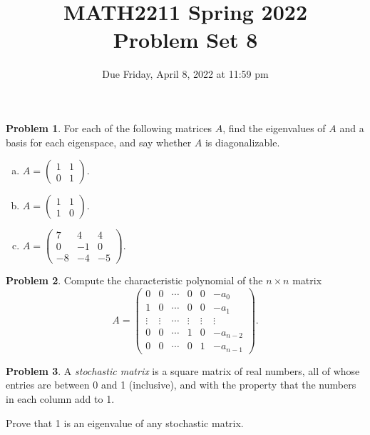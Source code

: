 \documentclass[11pt,oneside]{amsart}
\title{MATH2211 Spring 2022\\
Problem Set 8}
\author{Due Friday, April 8, 2022 at 11:59 pm}
\theoremstyle{definition}
\newtheorem{problem}{Problem}
\begin{document}
    \maketitle
    
    \begin{problem}
        For each of the following matrices $A$, find the eigenvalues of $A$ and a basis for each eigenspace, and say whether $A$ is diagonalizable.
        \begin{enumerate}[(a)]
            \item $A=\begin{pmatrix}
                1&1\\0&1
            \end{pmatrix}$.
            \item $A=\begin{pmatrix}
                1&1\\1&0
            \end{pmatrix}$.
            \item $A=\begin{pmatrix}
                7&4&4\\0&-1&0\\-8&-4&-5
            \end{pmatrix}$.
        \end{enumerate}
    \end{problem}

    \begin{problem}
        Compute the characteristic polynomial of the $n\times n$ matrix
        \[A=\begin{pmatrix}
            0&0&\cdots&0&0&-a_0\\
            1&0&\cdots&0&0&-a_1\\
            \vdots&\vdots&\cdots&\vdots&\vdots&\vdots\\
            0&0&\cdots&1&0&-a_{n-2}\\
            0&0&\cdots&0&1&-a_{n-1}
        \end{pmatrix}.\]
    \end{problem}

    \begin{problem}
        A \emph{stochastic matrix} is a square matrix of real numbers, all of whose entries are between 0 and 1 (inclusive), and with the property that the numbers in each column add to 1.

        Prove that 1 is an eigenvalue of any stochastic matrix.
    \end{problem}
    
\end{document}

